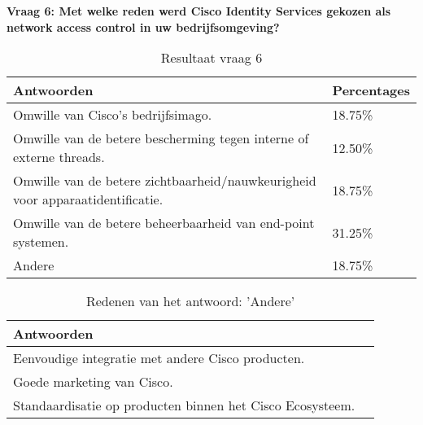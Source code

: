 \newpage
\textbf{Vraag 6: Met welke reden werd Cisco Identity Services gekozen als network access control in uw bedrijfsomgeving?}
\begin{table}[H]
	\begin{center}
		\begin{tabular}{|l|l|}
			\hline
			\bf Antwoorden    & \bf Percentages \\ \hline
			Omwille van Cisco's bedrijfsimago.                                                   & 18.75\% \\ \hline
			Omwille van de betere bescherming tegen interne of externe threads.                  & 12.50\% \\ \hline
			Omwille van de betere zichtbaarheid/nauwkeurigheid voor apparaatidentificatie.       & 18.75\% \\ \hline
			Omwille van de betere beheerbaarheid van end-point systemen.                         & 31.25\% \\ \hline
			Andere                                                                               & 18.75\% \\ \hline                                                        
		\end{tabular}
		\caption{Resultaat vraag 6}
		\label{tab:vraag6}
	\end{center}
\end{table}

\begin{table}[h!]
	\begin{center}
		\begin{tabular}{|l|l|}
			\hline
			\bf Antwoorden  \\ \hline
			Eenvoudige integratie met andere Cisco producten. \\ \hline
			Goede marketing van Cisco. \\ \hline
			Standaardisatie op producten binnen het Cisco Ecosysteem.\\ \hline
		\end{tabular}
		\caption{Redenen van het antwoord: 'Andere'}
	\end{center}
\end{table}


